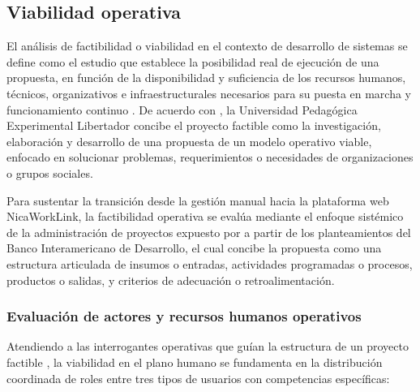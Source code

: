 \subsection{Viabilidad operativa}
El análisis de factibilidad o viabilidad en el contexto de desarrollo de sistemas se define como el estudio que establece la posibilidad real de ejecución de una propuesta, en función de la disponibilidad y suficiencia de los recursos humanos, técnicos, organizativos e infraestructurales necesarios para su puesta en marcha y funcionamiento continuo \parencite{dubsdemoya2002}. De acuerdo con \textcite{dubsdemoya2002}, la Universidad Pedagógica Experimental Libertador \parencite{upel1998} concibe el proyecto factible como la investigación, elaboración y desarrollo de una propuesta de un modelo operativo viable, enfocado en solucionar problemas, requerimientos o necesidades de organizaciones o grupos sociales.

Para sustentar la transición desde la gestión manual hacia la plataforma web NicaWorkLink, la factibilidad operativa se evalúa mediante el enfoque sistémico de la administración de proyectos expuesto por \textcite{dubsdemoya2002} a partir de los planteamientos del Banco Interamericano de Desarrollo, el cual concibe la propuesta como una estructura articulada de insumos o entradas, actividades programadas o procesos, productos o salidas, y criterios de adecuación o retroalimentación.


\subsubsection{Evaluación de actores y recursos humanos operativos}

Atendiendo a las interrogantes operativas que guían la estructura de un proyecto factible \parencite{dubsdemoya2002}, la viabilidad en el plano humano se fundamenta en la distribución coordinada de roles entre tres tipos de usuarios con competencias específicas:

